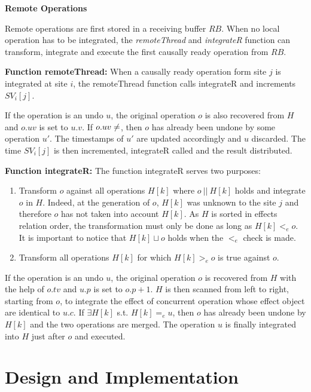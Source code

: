 \documentclass[11pt, a4paper, oneside, openright]{article} %
\begin{document}
\textbf{Remote Operations}

Remote operations are first stored in a receiving buffer $RB$. When no local operation has to be integrated, the \textit{remoteThread} and \textit{integrateR} function can transform, integrate and execute the first causally ready operation from $RB$.

\textbf{Function remoteThread:} When a causally ready operation form site $j$ is integrated at site $i$, the remoteThread function calls integrateR and increments $SV_i[j]$.

If the operation is an undo $u$, the original operation $o$ is also recovered from $H$ and $o.uv$ is set to $u.v$. If $o.uv \neq \empty$, then $o$ has already been undone by some operation $u'$. The timestamps of $u'$ are updated accordingly and $u$ discarded.
The time $SV_i[j]$ is then incremented, integrateR called and the result distributed.


\textbf{Function integrateR:} The function integrateR serves two purposes: 

\begin{enumerate}
	\item Transform $o$ against all operations $H[k]$ where $o\ ||\ H[k]$ holds and integrate $o$ in $H$. Indeed, at the generation of $o$, $H[k]$ was unknown to the site $j$ and therefore $o$ has not taken into account $H[k]$. As $H$ is sorted in effects relation order, the transformation must only be done as long as $H[k] <_e o$. It is important to notice that $H[k] \sqcup o$ holds when the $<_e$ check is made.
	\item Transform all operations $H[k]$ for which $H[k] >_e o$ is true against $o$.
\end{enumerate}

If the operation is an undo $u$, the original operation $o$ is recovered from $H$ with the help of $o.tv$ and $u.p$ is set to $o.p + 1$. $H$ is then scanned from left to right, starting from $o$, to integrate the effect of concurrent operation whose effect object are identical to $u.c$. If $\exists H[k]$ s.t. $H[k] =_e u$, then $o$ has already been undone by $H[k]$ and the two operations are merged. The operation $u$ is finally integrated into $H$ just after $o$ and executed.


\section{Design and Implementation}
\label{sec:designimplementation}
\end{document}
